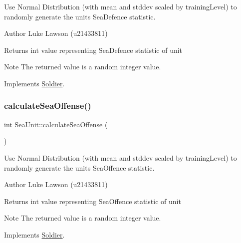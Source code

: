Use Normal Distribution (with mean and stddev scaled by training\+Level) to randomly generate the unit\textquotesingle{}s Sea\+Defence statistic. 

\begin{DoxyAuthor}{Author}
Luke Lawson (u21433811) 
\end{DoxyAuthor}
\begin{DoxyReturn}{Returns}
int value representing Sea\+Defence statistic of unit 
\end{DoxyReturn}
\begin{DoxyNote}{Note}
The returned value is a random integer value. 
\end{DoxyNote}


Implements \mbox{\hyperlink{class_soldier_a6508d8539b427a9af01aabc07ba6ca8e}{Soldier}}.

\mbox{\label{class_sea_unit_a3c275db4b9bf8cef62975d6c26ce79f8}} 
\subsubsection{\texorpdfstring{calculateSeaOffense()}{calculateSeaOffense()}}
{\footnotesize\ttfamily int Sea\+Unit\+::calculate\+Sea\+Offense (\begin{DoxyParamCaption}{ }\end{DoxyParamCaption})\hspace{0.3cm}{\ttfamily [virtual]}}



Use Normal Distribution (with mean and stddev scaled by training\+Level) to randomly generate the unit\textquotesingle{}s Sea\+Offence statistic. 

\begin{DoxyAuthor}{Author}
Luke Lawson (u21433811) 
\end{DoxyAuthor}
\begin{DoxyReturn}{Returns}
int value representing Sea\+Offence statistic of unit 
\end{DoxyReturn}
\begin{DoxyNote}{Note}
The returned value is a random integer value. 
\end{DoxyNote}


Implements \mbox{\hyperlink{class_soldier_acdaf5453ea0f87b3219185b0a52dd869}{Soldier}}.

